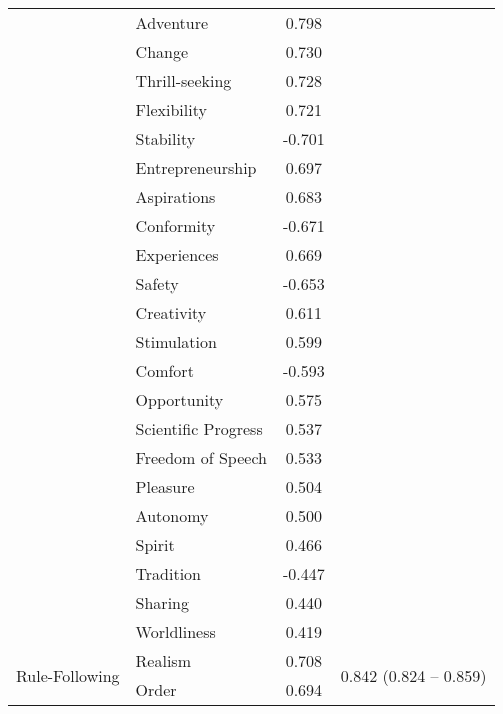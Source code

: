 \begin{longtable}{llcc}
                                  & Adventure      & 0.798 & \\
                                  & Change         & 0.730 & \\
                                  & Thrill-seeking & 0.728 & \\
                                  & Flexibility    & 0.721 & \\
                                  & Stability      & -0.701 & \\
                                  & Entrepreneurship & 0.697 & \\
                                  & Aspirations    & 0.683 & \\
                                  & Conformity     & -0.671 & \\
                                  & Experiences    & 0.669 & \\
                                  & Safety         & -0.653 & \\
                                  & Creativity     & 0.611 & \\
                                  & Stimulation    & 0.599 & \\
                                  & Comfort        & -0.593 & \\
                                  & Opportunity    & 0.575 & \\
                                  & Scientific Progress & 0.537 & \\
                                  & Freedom of Speech & 0.533 & \\
                                  & Pleasure       & 0.504 & \\
                                  & Autonomy       & 0.500 & \\
                                  & Spirit         & 0.466 & \\
                                  & Tradition      & -0.447 & \\
                                  & Sharing        & 0.440 & \\
                                  & Worldliness    & 0.419 & \\
        \midrule
        \multirow{15}{*}{Rule-Following}
                                &  Realism    & 0.708 & \multirow{15}{*}{0.842 (0.824 -- 0.859)} \\
                                &  Order      & 0.694 & \\

\end{longtable}
